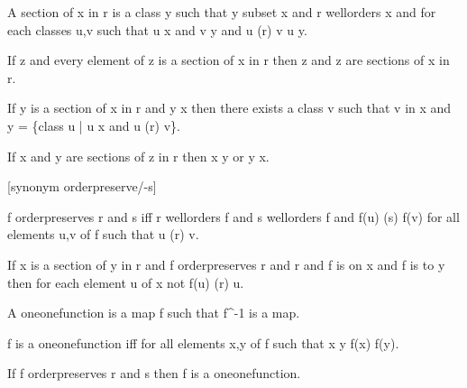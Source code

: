 \documentclass[a4paper,draft]{amsproc}
\begin{document}
\begin{forthel}
\begin{definition}[89]
A section of x in r is a class y such that y subset x and r wellorders x
and for each classes u,v such that u \in x and v \in y and u (r) v u \in y.
\end{definition}

\begin{theorem}[90]
If z  and every element of z is a section of x in r then \bigcup z and \bigcap z are sections of x in r.
\end{theorem}

\begin{theorem}[91]
If y is a section of x in r and y \neq x then there exists a class v such that v in x and 
y = \{class u | u \in x and u (r) v\}.
\end{theorem}

\begin{theorem}[92]
If x and y are sections of z in r then x \subset y or y \subset x.
\end{theorem}

[synonym orderpreserve/-s]
\begin{definition}[93]
f orderpreserves r and s iff r wellorders \domain f and s wellorders \range f
and f(u) (s) f(v) for all elements u,v of \domain f such that u (r) v.
\end{definition}

\begin{theorem}[94]
If x is a section of y in r and f orderpreserves r and r and f is on x and f is to y
then for each element u of x not f(u) (r) u.
\end{theorem}

\begin{definition}[95]
A oneonefunction is a map f such that f^{-1} is a map.
\end{definition}

\begin{lemma}
f is a oneonefunction iff for all elements x,y of \domain f such that x \neq y f(x) \neq f(y).
\end{lemma}

\begin{theorem}[96a]
If f orderpreserves r and s then f is a oneonefunction.
\end{theorem}


\end{forthel}
\end{document}
